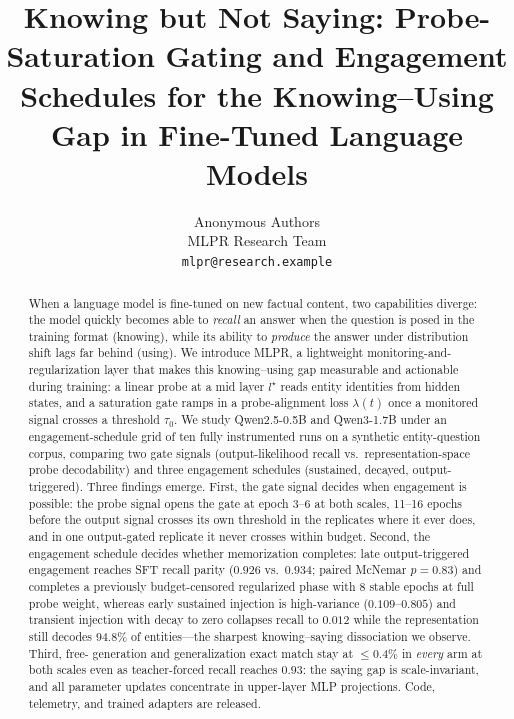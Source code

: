 \documentclass{article} %
\title{Knowing but Not Saying: Probe-Saturation Gating and Engagement
  Schedules for the Knowing--Using Gap in Fine-Tuned Language Models}
\author{Anonymous Authors\\
  MLPR Research Team\\
  \texttt{mlpr@research.example} \\
}
\begin{document}
\ifcolmsubmission
\linenumbers
\fi

\maketitle

\begin{abstract}
When a language model is fine-tuned on new factual content, two capabilities
diverge: the model quickly becomes able to \emph{recall} an answer when the
question is posed in the training format (knowing), while its ability to
\emph{produce} the answer under distribution shift lags far behind (using).
We introduce MLPR, a lightweight monitoring-and-regularization layer that
makes this knowing--using gap measurable and actionable during training: a
linear probe at a mid layer $l^\star$ reads entity identities from hidden
states, and a saturation gate ramps in a probe-alignment loss
$\lambda(t)$ once a monitored signal crosses a threshold $\tau_0$. We
study Qwen2.5-0.5B and Qwen3-1.7B under an engagement-schedule grid of
ten fully instrumented runs on a synthetic entity-question corpus,
comparing two gate signals (output-likelihood recall vs.\
representation-space probe decodability) and three engagement schedules
(sustained, decayed, output-triggered). Three findings emerge. First,
the gate signal decides when engagement is possible: the probe signal
opens the gate at epoch 3--6 at both scales, 11--16 epochs before the
output signal crosses its own threshold in the replicates where it
ever does, and in one output-gated replicate it never crosses within
budget. Second, the engagement
schedule decides whether memorization completes: late output-triggered
engagement reaches SFT recall parity ($0.926$ vs.\ $0.934$; paired
McNemar $p{=}0.83$) and completes a previously budget-censored
regularized phase with 8 stable epochs at full probe weight, whereas
early sustained injection is high-variance ($0.109$--$0.805$) and
transient injection with decay to zero collapses recall to $0.012$
while the representation still decodes $94.8\%$ of entities---the
sharpest knowing--saying dissociation we observe. Third, free-
generation and generalization exact match stay at $\le 0.4\%$ in
\emph{every} arm at both scales even as teacher-forced recall reaches
$0.93$: the saying gap is scale-invariant, and all parameter updates
concentrate in upper-layer MLP projections. Code, telemetry, and
trained adapters are released.
\end{abstract}









\appendix

\end{document}

